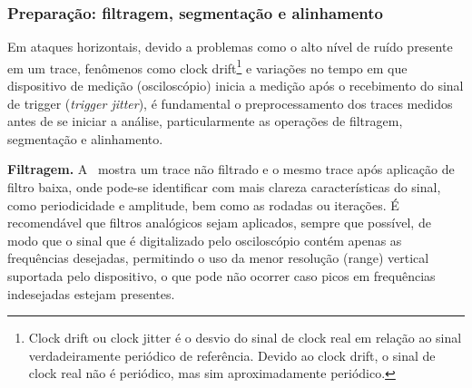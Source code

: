 \subsubsection{Preparação: filtragem, segmentação e alinhamento}

Em ataques horizontais, devido a problemas como o alto nível de ruído presente em um trace, fenômenos como clock drift\footnote{Clock drift ou clock jitter é o desvio do sinal de clock real em relação ao sinal verdadeiramente periódico de referência. Devido ao clock drift, o sinal de clock real não é periódico, mas sim aproximadamente periódico.} e variações no tempo em que dispositivo de medição (osciloscópio) inicia a medição após o recebimento do sinal de trigger (\textit{trigger jitter}), é fundamental o preprocessamento dos traces medidos antes de se iniciar a análise, particularmente as operações de filtragem, segmentação e alinhamento.

\noindent \textbf{Filtragem.} A~ mostra um trace não filtrado e o mesmo trace após aplicação de filtro baixa, onde pode-se identificar com mais clareza características do sinal, como periodicidade e amplitude, bem como as rodadas ou iterações. É recomendável que filtros analógicos sejam aplicados, sempre que possível, de modo que o sinal que é digitalizado pelo osciloscópio contém apenas as frequências desejadas, permitindo o uso da menor resolução (range) vertical suportada pelo dispositivo, o que pode não ocorrer caso picos em frequências indesejadas estejam presentes.

